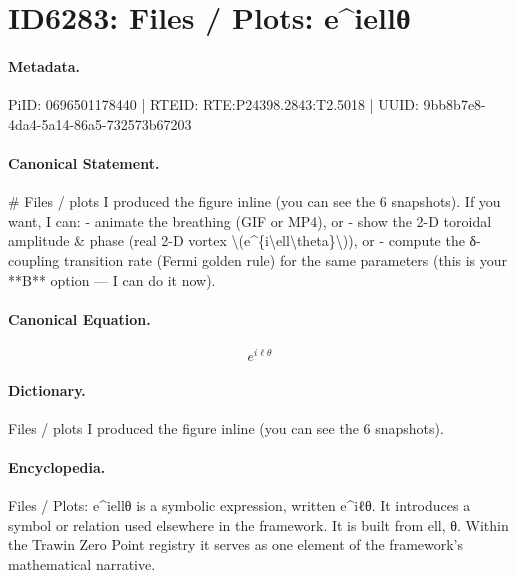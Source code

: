\section*{ID6283: Files / Plots: e\textasciicircum{}iellθ}
\paragraph{Metadata.}
PiID: 0696501178440 | RTEID: RTE:P24398.2843:T2.5018 | UUID: 9bb8b7e8-4da4-5a14-86a5-732573b67203

\paragraph{Canonical Statement.}
\# Files / plots I produced the figure inline (you can see the 6 snapshots). If you want, I can: - animate the breathing (GIF or MP4), or - show the 2-D toroidal amplitude \& phase (real 2-D vortex \textbackslash{}(e\textasciicircum{}\{i\textbackslash{}ell\textbackslash{}theta\}\textbackslash{})), or - compute the δ-coupling transition rate (Fermi golden rule) for the same parameters (this is your **B** option — I can do it now).

\paragraph{Canonical Equation.}
\[
e^{i\ell\theta}
\]

\paragraph{Dictionary.}
Files / plots I produced the figure inline (you can see the 6 snapshots).

\paragraph{Encyclopedia.}
Files / Plots: e\textasciicircum{}iellθ is a symbolic expression, written e\textasciicircum{}iℓθ. It introduces a symbol or relation used elsewhere in the framework. It is built from ell, θ. Within the Trawin Zero Point registry it serves as one element of the framework's mathematical narrative.

